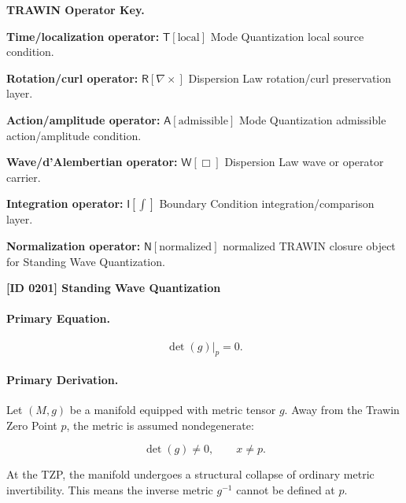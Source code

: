 \par\vspace{0.45\baselineskip}
\noindent\begin{minipage}[t]{\linewidth}
\begingroup
\small
\raggedright
\textbf{TRAWIN Operator Key.}\par
\noindent\textbf{Time/localization operator:} $\mathsf{T}\!\left[\mathrm{local}\right]$ Mode Quantization local source condition.\par
\noindent\textbf{Rotation/curl operator:} $\mathsf{R}\!\left[\nabla\times\right]$ Dispersion Law rotation/curl preservation layer.\par
\noindent\textbf{Action/amplitude operator:} $\mathsf{A}\!\left[\mathrm{admissible}\right]$ Mode Quantization admissible action/amplitude condition.\par
\noindent\textbf{Wave/d'Alembertian operator:} $\mathsf{W}\!\left[\Box\right]$ Dispersion Law wave or operator carrier.\par
\noindent\textbf{Integration operator:} $\mathsf{I}\!\left[\int\right]$ Boundary Condition integration/comparison layer.\par
\noindent\textbf{Normalization operator:} $\mathsf{N}\!\left[\mathrm{normalized}\right]$ normalized TRAWIN closure object for Standing Wave Quantization.\par
\endgroup
\end{minipage}

\clearpage
\noindent\textbf{[ID 0201] Standing Wave Quantization}\par
\vspace{0.35em}
\paragraph{Primary Equation.}
\begin{equation}
\det(g)\big|_{p}=0 .
\end{equation}

\paragraph{Primary Derivation.}
Let $(M,g)$ be a manifold equipped with metric tensor $g$. Away from the Trawin Zero Point $p$, the metric is assumed nondegenerate:

\begin{equation}
\det(g)\neq 0,
\qquad x\neq p .
\end{equation}

At the TZP, the manifold undergoes a structural collapse of ordinary metric invertibility. This means the inverse metric $g^{-1}$ cannot be defined at $p$.

